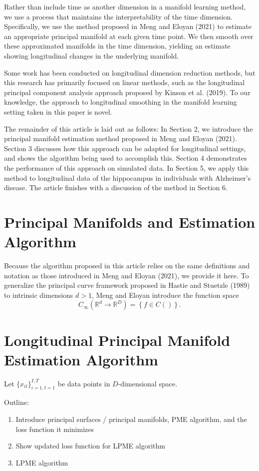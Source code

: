 \documentclass[11pt,reqno]{article}
\begin{document}
Rather than include time as another dimension in a manifold learning method, we use a process that maintains the interpretability of the time dimension. Specifically, we use the method proposed in Meng and Eloyan (2021) to estimate an appropriate principal manifold at each given time point. We then smooth over these approximated manifolds in the time dimension, yielding an estimate showing longitudinal changes in the underlying manifold.

Some work has been conducted on longitudinal dimension reduction methods, but this research has primarily focused on linear methods, such as the longitudinal principal component analysis approach proposed by Kinson et al. (2019). To our knowledge, the approach to longitudinal smoothing in the manifold learning setting taken in this paper is novel.

The remainder of this article is laid out as follows: In Section 2, we introduce the principal manifold estimation method proposed in Meng and Eloyan (2021). Section 3 discusses how this approach can be adapted for longitudinal settings, and shows the algorithm being used to accomplish this. Section 4 demonstrates the performance of this approach on simulated data. In Section 5, we apply this method to longitudinal data of the hippocampus in individuals with Alzheimer's disease. The article finishes with a discussion of the method in Section 6.

\section{Principal Manifolds and Estimation Algorithm}

Because the algorithm proposed in this article relies on the same definitions and notation as those introduced in Meng and Eloyan (2021), we provide it here. To generalize the principal curve framework proposed in Hastie and Stuetzle (1989) to intrinsic dimensions $d > 1$, Meng and Eloyan introduce the function space 
\[%
  C_{\infty}(\mathbb{R}^d \to \mathbb{R}^D) = \left\{f \in C()\right\}
.\]%

\section{Longitudinal Principal Manifold Estimation Algorithm}

Let $\{x_{it}\}_{i=1, t=1}^{I, T}$ be data points in $D$-dimensional space.

Outline:
\begin{enumerate}
    \item Introduce principal surfaces / principal manifolds, PME algorithm, and the loss function it minimizes
    \item Show updated loss function for LPME algorithm
    \item LPME algorithm
\end{enumerate}
\end{document}
